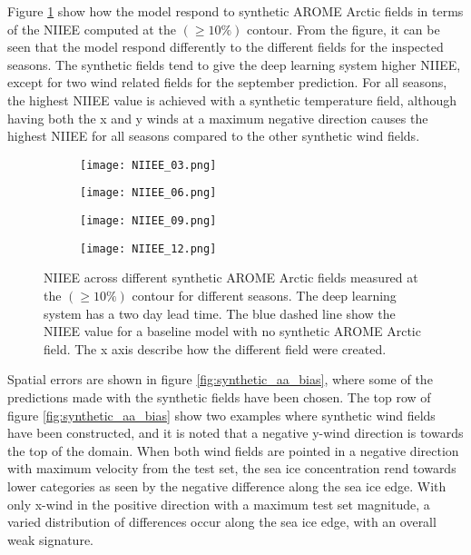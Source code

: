 \documentclass[../main/thesis.tex]{subfiles}
\begin{document}
Figure \ref{fig:synthetic_aa_niiee} show how the model respond to synthetic AROME Arctic fields in terms of the NIIEE computed at the $(\geq10\%)$ contour. From the figure, it can be seen that the model respond differently to the different fields for the inspected seasons. The synthetic fields tend to give the deep learning system higher NIIEE, except for two wind related fields for the september prediction. For all seasons, the highest NIIEE value is achieved with a synthetic temperature field, although having both the x and y winds at a maximum negative direction causes the highest NIIEE for all seasons compared to the other synthetic wind fields.

\begin{figure}
    \centering
    \begin{subfigure}{.49\textwidth}
        \texttt{[image: NIIEE\_03.png]}
    \end{subfigure}
    \begin{subfigure}{.49\textwidth}
        \texttt{[image: NIIEE\_06.png]}
    \end{subfigure}
    \begin{subfigure}{.49\textwidth}
        \texttt{[image: NIIEE\_09.png]}
    \end{subfigure}
    \begin{subfigure}{.49\textwidth}
        \texttt{[image: NIIEE\_12.png]}
    \end{subfigure}
    \caption{\label{fig:synthetic_aa_niiee}NIIEE across different synthetic AROME Arctic fields measured at the $(\geq10\%)$ contour for different seasons. The deep learning system has a two day lead time. The blue dashed line show the NIIEE value for a baseline model with no synthetic AROME Arctic field. The x axis describe how the different field were created.}
\end{figure}

Spatial errors are shown in figure \ref{fig:synthetic_aa_bias}, where some of the predictions made with the synthetic fields have been chosen. The top row of figure \ref{fig:synthetic_aa_bias} show two examples where synthetic wind fields have been constructed, and it is noted that a negative y-wind direction is towards the top of the domain. When both wind fields are pointed in a negative direction with maximum velocity from the test set, the sea ice concentration rend towards lower categories as seen by the negative difference along the sea ice edge. With only x-wind in the positive direction with a maximum test set magnitude, a varied distribution of differences occur along the sea ice edge, with an overall weak signature.
\end{document}
